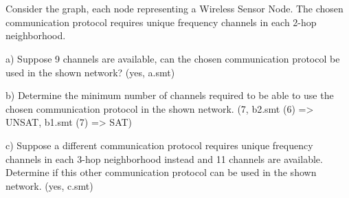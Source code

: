 \chapter{}\label{chp:4}

Consider the graph, each node representing a Wireless Sensor Node. The chosen communication protocol requires unique frequency channels in each 2-hop neighborhood.

a) Suppose 9 channels are available, can the chosen communication protocol be used in the shown network?
(yes, a.smt)

b) Determine the minimum number of channels required to be able to use the chosen communication protocol in the shown network.
(7, b2.smt (6) => UNSAT, b1.smt (7) => SAT)

c) Suppose a different communication protocol requires unique frequency channels in each 3-hop neighborhood instead and 11 channels are available. Determine if this other communication protocol can be used in the shown network.
(yes, c.smt)
